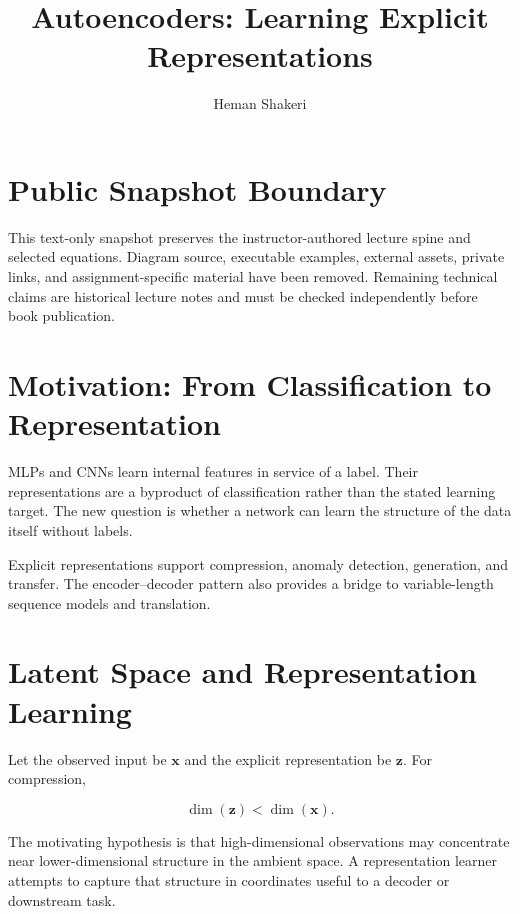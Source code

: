 \documentclass{article}
\title{Autoencoders: Learning Explicit Representations}
\author{Heman Shakeri}
\date{}
\begin{document}
\maketitle

\section*{Public Snapshot Boundary}

This text-only snapshot preserves the instructor-authored lecture spine and selected
equations. Diagram source, executable examples, external assets, private links, and
assignment-specific material have been removed. Remaining technical claims are
historical lecture notes and must be checked independently before book publication.

\section{Motivation: From Classification to Representation}

MLPs and CNNs learn internal features in service of a label. Their representations are
a byproduct of classification rather than the stated learning target. The new question
is whether a network can learn the structure of the data itself without labels.

Explicit representations support compression, anomaly detection, generation, and
transfer. The encoder--decoder pattern also provides a bridge to variable-length
sequence models and translation.

\section{Latent Space and Representation Learning}

Let the observed input be $\mathbf{x}$ and the explicit representation be
$\mathbf{z}$. For compression,

\[
\dim(\mathbf{z}) < \dim(\mathbf{x}).
\]

The motivating hypothesis is that high-dimensional observations may concentrate near
lower-dimensional structure in the ambient space. A representation learner attempts
to capture that structure in coordinates useful to a decoder or downstream task.

\end{document}
